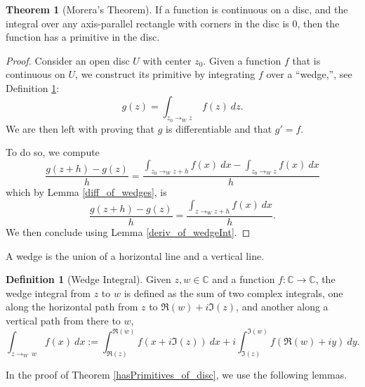 \documentclass{report}
\theoremstyle{definition}
\newtheorem{definition}{Definition}
\newtheorem{theorem}{Theorem}
\begin{document}
\begin{theorem}[Morera's Theorem]
  \label{moreras_theorem}
  If a function is continuous on a disc, and the 
  integral over any axis-parallel rectangle with corners in the disc is $0$, then the function 
  has a primitive in the disc.
\end{theorem}

\begin{proof}
  Consider an open disc $U$ with center $z_0$.
  Given a function $f$ that is continuous on $U$, we construct its primitive by integrating $f$ over a ``wedge,'', see Definition \ref{WedgeInt}:
  \begin{equation}
    g(z)=\int_{z_0\to_W z}\ f(z)\ dz
    .
  \end{equation}
  We are then left with proving that $g$ is differentiable and that $g'=f$.

  To do so, we compute
  \begin{equation}
    \frac{g(z+h)-g(z)}h
    =
    \frac{\int_{z_0\to_W z+h} f(x)\ dx-\int_{z_0\to_W z} f(x)\ dx}h
  \end{equation}
  which by Lemma \ref{diff_of_wedges}, is
  \begin{equation}
    \frac{g(z+h)-g(z)}h
    =
    \frac{\int_{z\to_W z+h} f(x)\ dx}h
    .
  \end{equation}
  We then conclude using Lemma \ref{deriv_of_wedgeInt}.
\end{proof}


A wedge is the union of a horizontal line and a vertical line.

\begin{definition}[Wedge Integral]
  \label{WedgeInt}
  \leanok
  Given $z,w\in\mathbb C$ and a function $f:\mathbb C\to\mathbb C$, the wedge integral from $z$ to $w$ is defined as the sum of two complex integrals, one along the horizontal path from $z$ to $\Re(w)+i \Im(z)$, and another along a vertical path from there to $w$,
   \begin{equation}
      \int_{z\to_W\  w} f(x)\ dx
      :=
      \int_{\Re(z)}^{\Re(w)} f(x+i\Im(z))\ dx
      +
      i\int_{\Im(z)}^{\Im(w)} f(\Re(w)+iy)\ dy
      .
   \end{equation}
\end{definition}

In the proof of Theorem \ref{hasPrimitives_of_disc}, we use the following lemmas.
\end{document}
